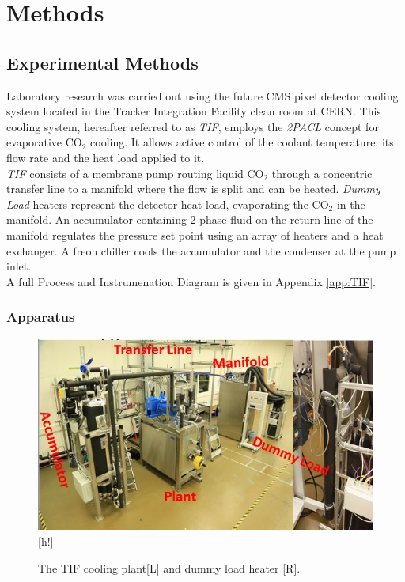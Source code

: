\documentclass{report}
\begin{document}
\chapter{Methods} 
\label{methods}
\section{Experimental Methods}
Laboratory research was carried out using the future CMS pixel detector cooling system located in the Tracker Integration Facility clean room at CERN. This cooling system, hereafter referred to as \textit{TIF}, employs the \textit{2PACL} concept for evaporative CO$_2$ cooling. It allows active control of the coolant temperature, its flow rate and the heat load applied to  it. \\
\textit{TIF} consists of a membrane pump routing liquid CO$_2$ through a concentric transfer line to a manifold where the flow is split and can be heated. \textit{Dummy Load} heaters represent the detector heat load, evaporating the CO$_2$ in the manifold. An accumulator containing 2-phase fluid on the return line of the manifold regulates the pressure set point using an array of heaters and a heat exchanger. A freon chiller cools the accumulator and the condenser at the pump inlet.\\
A full Process and Instrumenation Diagram is given in Appendix \ref{app:TIF}.
\subsection{Apparatus}

\begin{figure}
\includegraphics[width=\textwidth]{TIFandHeater.jpg}[h!]
\caption{The TIF cooling plant[L] and dummy load heater [R]. \cite{tif web}}
\label{fig:TIF}
\end{figure}
\end{document}
